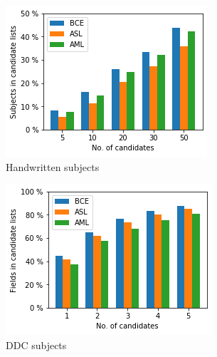 \begin{figure}
  \begin{subfigure}[t]{.32\textwidth}
    \centering
    \includegraphics[width=\textwidth]{figures/supervised_approach/all_hw.png}
    \caption{Handwritten subjects}
    \label{fig:all_hw}
  \end{subfigure}
  \begin{subfigure}[t]{.32\textwidth}
    \centering
    \includegraphics[width=\textwidth]{figures/supervised_approach/all_ddc.png}
    \caption{DDC subjects}
    \label{fig:all_ddc}
  \end{subfigure}
   \begin{subfigure}[t]{.32\textwidth}
    \centering

\end{subfigure}
\end{figure}
